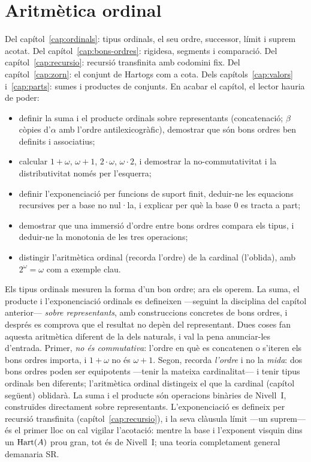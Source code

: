 \chapter{Aritmètica ordinal}\label{cap:aritmetica-ordinal}

\begin{objectius}
 Del capítol~\ref{cap:ordinals}: tipus ordinals, el seu ordre, successor, límit i suprem acotat. Del capítol~\ref{cap:bons-ordres}: rigidesa, segments i comparació. Del capítol~\ref{cap:recursio}: recursió transfinita amb codomini fix. Del capítol~\ref{cap:zorn}: el conjunt de Hartogs com a cota. Dels capítols~\ref{cap:valors} i~\ref{cap:parts}: sumes i productes de conjunts.
 En acabar el capítol, el lector hauria de poder:
\begin{itemize}
  \item definir la suma i el producte ordinals sobre representants (concatenació; \(\beta\) còpies d'\(\alpha\) amb l'ordre antilexicogràfic), demostrar que són bons ordres ben definits i associatius;
  \item calcular \(1+\omega\), \(\omega+1\), \(2\cdot\omega\), \(\omega\cdot2\), i demostrar la no-commutativitat i la distributivitat només per l'esquerra;
  \item definir l'exponenciació per funcions de suport finit, deduir-ne les equacions recursives per a base no nul·la, i explicar per què la base \(0\) es tracta a part;
  \item demostrar que una immersió d'ordre entre bons ordres compara els tipus, i deduir-ne la monotonia de les tres operacions;
  \item distingir l'aritmètica ordinal (recorda l'ordre) de la cardinal (l'oblida), amb \(2^{\omega}=\omega\) com a exemple clau.
\end{itemize}
\end{objectius}

Els tipus ordinals mesuren la forma d'un bon ordre; ara els operem. La suma,
el producte i l'exponenciació ordinals es defineixen ---seguint la disciplina
del capítol anterior--- \emph{sobre representants}, amb construccions
concretes de bons ordres, i després es comprova que el resultat no depèn del
representant. Dues coses fan aquesta aritmètica diferent de la dels naturals,
i val la pena anunciar-les d'entrada. Primer, \emph{no és commutativa}: l'ordre
en què es concatenen o s'iteren els bons ordres importa, i \(1+\omega\) no és
\(\omega+1\). Segon, recorda \emph{l'ordre} i no la \emph{mida}: dos bons
ordres poden ser equipotents ---tenir la mateixa cardinalitat--- i tenir tipus
ordinals ben diferents; l'aritmètica ordinal distingeix el que la cardinal
(capítol següent) oblidarà. La suma i el producte són operacions binàries de
Nivell~I, construïdes directament sobre representants. L'exponenciació es
defineix per recursió transfinita (capítol~\ref{cap:recursio}), i la seva
clàusula límit ---un suprem--- és el primer lloc on cal vigilar l'acotació:
mentre la base i l'exponent visquin dins un \(\operatorname{Hart}(A)\) prou gran, tot és de
Nivell~I; una teoria completament general demanaria SR.

